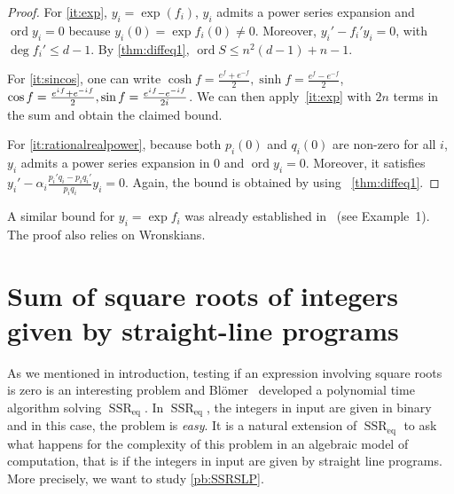 \documentclass[a4paper, 11pt,dvipsnames]{article}
\newcommand{\iu}{{i\mkern1mu}}
\newcommand{\ord}{\operatorname{ord}}
\newcommand{\SSReq}{\operatorname{SSR}_{\operatorname{eq}}}
\begin{document}
\begin{proof} For \cref{it:exp}, $y_i = \exp(f_i)$, $y_i$ admits a power series expansion and $\ord y_i = 0$ because $y_i(0) = \exp f_i(0) \neq 0$. Moreover, $y_i' - f_i'y_i = 0$,
    with $\deg f_i' \le d-1$. By \cref{thm:diffeq1}, $\ord S \le n^2(d-1) + n-1$.

    For \cref{it:sincos}, one can write $\cosh f= \frac{e^f + e^{-f}}{2}, \sinh f= \frac{e^f - e^{-f}}{2}$, $\cos f  = \frac{e^{\iu f} + e^{-\iu f}}{2},\sin f = \frac{e^{\iu f} - e^{-\iu f}}{2\iu}$. We can then apply~\cref{it:exp} with $2n$ terms in the sum and obtain the claimed bound.

    For \cref{it:rationalrealpower}, because both $p_i(0)$ and $q_i(0)$ are non-zero for all $i$, $y_i$ admits a power series expansion in $0$ and $\ord y_i = 0$. Moreover, it
satisfies $y_i' - \alpha_i \frac{p_i'q_i - p_i q_i'}{p_i q_i} y_i = 0$. Again, the bound is obtained by using ~\cref{thm:diffeq1}.  \end{proof}

A similar bound for $y_i = \exp f_i$ was already established in~\cite{voorhoeve1975wronskian} (see Example~1). The proof also relies on Wronskians. 

\section{ Sum of square roots of integers given by straight-line programs }\label{sec:sum_sqroot_slp}

As we mentioned in introduction, testing if an expression involving square roots is zero is an interesting problem and Bl{\"o}mer~\cite{blomer1993computing} developed
a polynomial time algorithm solving $\SSReq$. In $\SSReq$, the integers in input are given in binary and in this case, the problem is \emph{easy}. It is a natural extension of $\SSReq$ to ask what happens for the complexity of this problem in an algebraic model of computation, that is if the integers in input are given by straight line programs. More precisely, we want to study \cref{pb:SSRSLP}.
\end{document}
